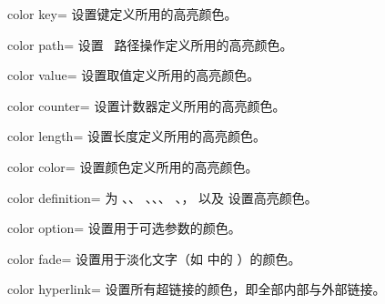 \begin{docTcbKey}{color key}{=}{}
  设置键定义所用的高亮颜色。
\end{docTcbKey}

\begin{docTcbKey}[][doc new={2019-09-18}]{color path}{=}{}
  设置 \tikzname\ 路径操作定义所用的高亮颜色。
\end{docTcbKey}

\begin{docTcbKey}{color value}{=}{}
  设置取值定义所用的高亮颜色。
\end{docTcbKey}

\begin{docTcbKey}[][doc new={2015-01-08}]{color counter}{=}{}
  设置计数器定义所用的高亮颜色。
\end{docTcbKey}

\begin{docTcbKey}[][doc new={2015-01-08}]{color length}{=}{}
  设置长度定义所用的高亮颜色。
\end{docTcbKey}

\begin{docTcbKey}{color color}{=}{}
  设置颜色定义所用的高亮颜色。
\end{docTcbKey}

\begin{docTcbKey}[][doc updated={2019-09-18}]{color definition}{=}{}
  为 、、
  、、、
  、，
  以及  设置高亮颜色。
\end{docTcbKey}

\begin{docTcbKey}{color option}{=}{}
  设置用于可选参数的颜色。
\end{docTcbKey}

\begin{docTcbKey}{color fade}{=}{}
  设置用于淡化文字（如  中的
  ）的颜色。
\end{docTcbKey}


\begin{docTcbKey}{color hyperlink}{=}{}
  设置所有超链接的颜色，即全部内部与外部链接。
\end{docTcbKey}


